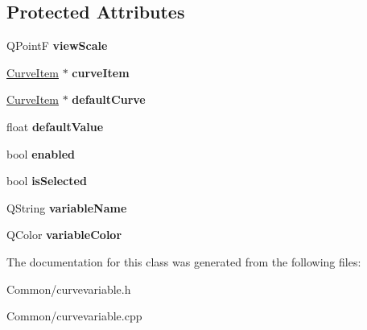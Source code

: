 \subsection*{\-Protected \-Attributes}
\begin{DoxyCompactItemize}
\item 
\hypertarget{class_curve_variable_a344fa130a6c62dd8b1444c6f395be08a}{
\-Q\-Point\-F {\bfseries view\-Scale}}
\label{class_curve_variable_a344fa130a6c62dd8b1444c6f395be08a}

\item 
\hypertarget{class_curve_variable_aada1eac891d7a47b433f19c15b3b0297}{
\hyperlink{class_curve_item}{\-Curve\-Item} $\ast$ {\bfseries curve\-Item}}
\label{class_curve_variable_aada1eac891d7a47b433f19c15b3b0297}

\item 
\hypertarget{class_curve_variable_a9ad48fb7d033eb97a09f2b0c437e11c8}{
\hyperlink{class_curve_item}{\-Curve\-Item} $\ast$ {\bfseries default\-Curve}}
\label{class_curve_variable_a9ad48fb7d033eb97a09f2b0c437e11c8}

\item 
\hypertarget{class_curve_variable_ad1feeeeb3369293a6b02b445a83208ae}{
float {\bfseries default\-Value}}
\label{class_curve_variable_ad1feeeeb3369293a6b02b445a83208ae}

\item 
\hypertarget{class_curve_variable_ab7895ee85a195e6c70bec3e0fb7f6f99}{
bool {\bfseries enabled}}
\label{class_curve_variable_ab7895ee85a195e6c70bec3e0fb7f6f99}

\item 
\hypertarget{class_curve_variable_a5d3e51e7622de2e8b5f3f384b9d5e492}{
bool {\bfseries is\-Selected}}
\label{class_curve_variable_a5d3e51e7622de2e8b5f3f384b9d5e492}

\item 
\hypertarget{class_curve_variable_ad8a3d5254ead338075eed78ccea283dc}{
\-Q\-String {\bfseries variable\-Name}}
\label{class_curve_variable_ad8a3d5254ead338075eed78ccea283dc}

\item 
\hypertarget{class_curve_variable_a92fc4ee2ede699055aceda45a94a23de}{
\-Q\-Color {\bfseries variable\-Color}}
\label{class_curve_variable_a92fc4ee2ede699055aceda45a94a23de}

\end{DoxyCompactItemize}


\-The documentation for this class was generated from the following files\-:\begin{DoxyCompactItemize}
\item 
\-Common/curvevariable.\-h\item 
\-Common/curvevariable.\-cpp\end{DoxyCompactItemize}
